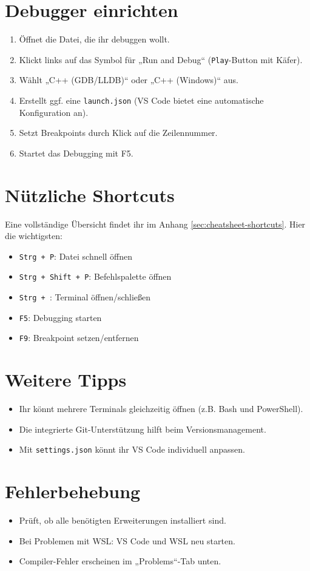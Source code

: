 \section{Debugger einrichten}
\begin{enumerate}
	\item Öffnet die Datei, die ihr debuggen wollt.
	\item Klickt links auf das Symbol für „Run and Debug“ (\texttt{Play}-Button mit Käfer).
	\item Wählt „C++ (GDB/LLDB)“ oder „C++ (Windows)“ aus.
	\item Erstellt ggf. eine \texttt{launch.json} (VS Code bietet eine automatische Konfiguration an).
	\item Setzt Breakpoints durch Klick auf die Zeilennummer.
	\item Startet das Debugging mit F5.
\end{enumerate}

\section{Nützliche Shortcuts}
Eine vollständige Übersicht findet ihr im Anhang \ref{sec:cheatsheet-shortcuts}. Hier die wichtigsten:
\begin{itemize}
	\item \texttt{Strg + P}: Datei schnell öffnen
	\item \texttt{Strg + Shift + P}: Befehlspalette öffnen
	\item \texttt{Strg + \textasciigrave}: Terminal öffnen/schließen
	\item \texttt{F5}: Debugging starten
	\item \texttt{F9}: Breakpoint setzen/entfernen
\end{itemize}

\section{Weitere Tipps}
\begin{itemize}
	\item Ihr könnt mehrere Terminals gleichzeitig öffnen (z.B. Bash und PowerShell).
	\item Die integrierte Git-Unterstützung hilft beim Versionsmanagement.
	\item Mit \texttt{settings.json} könnt ihr VS Code individuell anpassen.
\end{itemize}

\section{Fehlerbehebung}
\begin{itemize}
	\item Prüft, ob alle benötigten Erweiterungen installiert sind.
	\item Bei Problemen mit WSL: VS Code und WSL neu starten.
	\item Compiler-Fehler erscheinen im „Problems“-Tab unten.
\end{itemize}